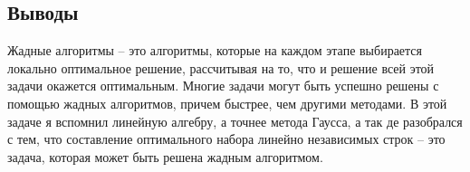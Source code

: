 \documentclass[12pt]{article}
\begin{document}
\subsection*{Выводы}

Жадные алгоритмы -- это алгоритмы, которые на каждом этапе выбирается локально оптимальное решение, рассчитывая на то, что и решение всей этой задачи окажется оптимальным. Многие задачи могут быть успешно решены с помощью жадных алгоритмов, причем быстрее, чем другими методами.\newline
В этой задаче я вспомнил линейную алгебру, а точнее метода Гаусса, а так де разобрался с тем, что составление оптимального набора линейно независимых строк -- это задача, которая может быть решена жадным алгоритмом.
\end{document}
